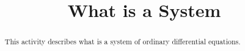 \documentclass{ximera}
\title{What is a System}
\begin{document}
\begin{abstract}
This activity describes what is a system of ordinary differential equations.
\end{abstract}

\maketitle
\end{document}
